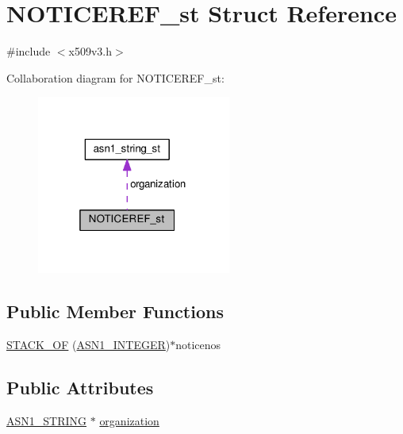 \hypertarget{struct_n_o_t_i_c_e_r_e_f__st}{}\section{N\+O\+T\+I\+C\+E\+R\+E\+F\+\_\+st Struct Reference}
\label{struct_n_o_t_i_c_e_r_e_f__st}


{\ttfamily \#include $<$x509v3.\+h$>$}



Collaboration diagram for N\+O\+T\+I\+C\+E\+R\+E\+F\+\_\+st\+:
\nopagebreak
\begin{figure}[H]
\begin{center}
\leavevmode
\includegraphics[width=181pt]{struct_n_o_t_i_c_e_r_e_f__st__coll__graph}
\end{center}
\end{figure}
\subsection*{Public Member Functions}
\begin{DoxyCompactItemize}
\item 
\hyperlink{struct_n_o_t_i_c_e_r_e_f__st_ab855b88346d126802c2985ec97b8b40e}{S\+T\+A\+C\+K\+\_\+\+OF} (\hyperlink{ossl__typ_8h_af4335399bf9774cb410a5e93de65998b}{A\+S\+N1\+\_\+\+I\+N\+T\+E\+G\+ER})$\ast$noticenos
\end{DoxyCompactItemize}
\subsection*{Public Attributes}
\begin{DoxyCompactItemize}
\item 
\hyperlink{ossl__typ_8h_ad37610875e38aa6c59f5e6e0b437e65c}{A\+S\+N1\+\_\+\+S\+T\+R\+I\+NG} $\ast$ \hyperlink{struct_n_o_t_i_c_e_r_e_f__st_ada82edab12b92e7b066281582e7992cb}{organization}
\end{DoxyCompactItemize}


